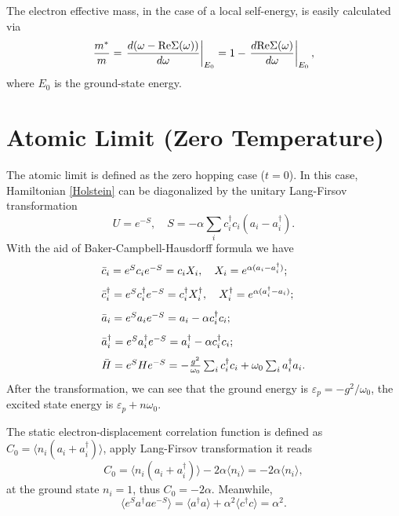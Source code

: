 \documentclass{book}
\renewcommand{\Re}{{\rm Re}}
\numberwithin{equation}{section}
\begin{document}
The electron effective mass, in the case of a local self-energy, is
easily calculated via
\begin{equation}
  \frac{m^*}{m}=\left.\frac{d(\omega-\Re\Sigma(\omega))}{d\omega}\right|_{E_0}
  =1-\left.\frac{d\Re\Sigma(\omega)}{d\omega}\right|_{E_0},
\end{equation}
where $E_0$ is the ground-state energy.

\section{Atomic Limit (Zero Temperature)}
The atomic limit is defined as the zero hopping case ($t=0$).
In this case, Hamiltonian \eqref{Holstein} can be diagonalized by 
the unitary Lang-Firsov transformation
\begin{equation}
  U=e^{-S},\quad S=-\alpha\sum_{i}c_i^\dag c_i(a_i-a_i^\dag).
\end{equation}
With the aid of Baker-Campbell-Hausdorff formula we have
\begin{equation}
  \begin{array}{l}
    \bar{c}_i=e^Sc_ie^{-S}=c_iX_i,\quad X_i=e^{\alpha(a_i-a_i^\dag)};\\\vbox to 18pt{}
    \bar{c}_i^\dag=e^Sc_i^\dag e^{-S}=c_i^\dag X_i^\dag, \quad
    X_i^\dag=e^{\alpha(a_i^\dag-a_i)};\\\vbox to 18pt{}
    \bar{a}_i=e^Sa_ie^{-S}=a_i-\alpha c_i^\dag c_i;\\\vbox to 18pt{}
    \bar{a}_i^\dag=e^Sa_i^\dag e^{-S}=a_i^\dag-\alpha c_i^\dag c_i;\\\vbox to 18pt{}
    \bar{H}=e^SHe^{-S}=-\frac{g^2}{\omega_0}\sum_ic_i^\dag c_i+
    \omega_0\sum_ia_i^\dag a_i.\\
  \end{array}
\end{equation}
After the transformation, we can see that the ground energy is
$\varepsilon_p=-g^2/\omega_0$, the excited state energy is 
$\varepsilon_p+n\omega_0$.

The static electron-displacement correlation function is defined as
$C_0=\langle n_i(a_i+a_i^\dag)\rangle$, apply Lang-Firsov
transformation it reads
\begin{equation}
  C_0=\langle n_i(a_i+a_i^\dag)\rangle-2\alpha\langle n_i\rangle
  =-2\alpha\langle n_i\rangle,
\end{equation}
at the ground state $n_i=1$, thus $C_0=-2\alpha$. Meanwhile, 
\begin{equation}
  \langle e^Sa^\dag ae^{-S}\rangle=\langle a^\dag a\rangle+
  \alpha^2\langle c^\dag c\rangle=\alpha^2.
\end{equation}
\end{document}
